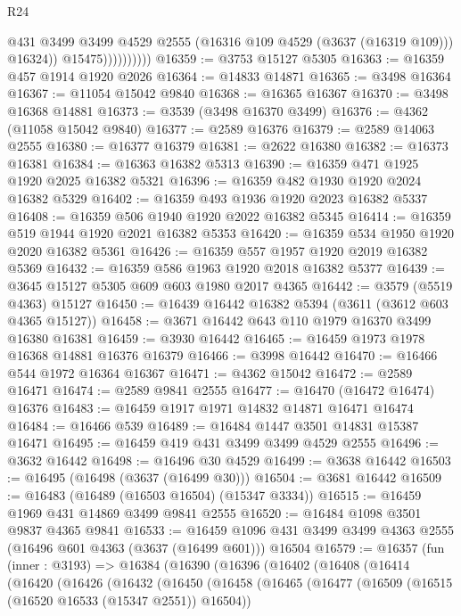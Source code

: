 \begin{lexlean}{R24}
\begin{coremodule}
                            @431
                            @3499
                            @3499
                            @4529
                            @2555
                            (@16316 @109 @4529 (@3637 (@16319 @109)))
                            @16324))
                        @15475))))))))))
@16359 := @3753 @15127 @5305
@16363 := @16359 @457 @1914 @1920 @2026
@16364 := @14833 @14871
@16365 := @3498 @16364
@16367 := @11054 @15042 @9840
@16368 := @16365 @16367
@16370 := @3498 @16368 @14881
@16373 := @3539 (@3498 @16370 @3499)
@16376 := @4362 (@11058 @15042 @9840)
@16377 := @2589 @16376
@16379 := @2589 @14063 @2555
@16380 := @16377 @16379
@16381 := @2622 @16380
@16382 := @16373 @16381
@16384 := @16363 @16382 @5313
@16390 := @16359 @471 @1925 @1920 @2025 @16382 @5321
@16396 := @16359 @482 @1930 @1920 @2024 @16382 @5329
@16402 := @16359 @493 @1936 @1920 @2023 @16382 @5337
@16408 := @16359 @506 @1940 @1920 @2022 @16382 @5345
@16414 := @16359 @519 @1944 @1920 @2021 @16382 @5353
@16420 := @16359 @534 @1950 @1920 @2020 @16382 @5361
@16426 := @16359 @557 @1957 @1920 @2019 @16382 @5369
@16432 := @16359 @586 @1963 @1920 @2018 @16382 @5377
@16439 := @3645 @15127 @5305 @609 @603 @1980 @2017 @4365
@16442 := @3579 (@5519 @4363) @15127
@16450 := @16439 @16442 @16382 @5394 (@3611 (@3612 @603 @4365 @15127))
@16458 := @3671 @16442 @643 @110 @1979 @16370 @3499 @16380 @16381
@16459 := @3930 @16442
@16465 := @16459 @1973 @1978 @16368 @14881 @16376 @16379
@16466 := @3998 @16442
@16470 := @16466 @544 @1972 @16364 @16367
@16471 := @4362 @15042
@16472 := @2589 @16471
@16474 := @2589 @9841 @2555
@16477 := @16470 (@16472 @16474) @16376
@16483 := @16459 @1917 @1971 @14832 @14871 @16471 @16474
@16484 := @16466 @539
@16489 := @16484 @1447 @3501 @14831 @15387 @16471
@16495 := @16459 @419 @431 @3499 @3499 @4529 @2555
@16496 := @3632 @16442
@16498 := @16496 @30 @4529
@16499 := @3638 @16442
@16503 := @16495 (@16498 (@3637 (@16499 @30)))
@16504 := @3681 @16442
@16509 := @16483 (@16489 (@16503 @16504) (@15347 @3334))
@16515 := @16459 @1969 @431 @14869 @3499 @9841 @2555
@16520 := @16484 @1098 @3501 @9837 @4365 @9841
@16533 := @16459 @1096 @431 @3499 @3499 @4363 @2555 (@16496 @601 @4363 (@3637 (@16499 @601))) @16504
@16579 := @16357
    (fun (inner : @3193) =>
    @16384
      (@16390
        (@16396
          (@16402
            (@16408
              (@16414
                (@16420
                  (@16426
                    (@16432
                      (@16450
                        (@16458
                          (@16465
                            (@16477
                              (@16509 (@16515 (@16520 @16533 (@15347 @2551)) @16504))

\end{coremodule}
\end{lexlean}
